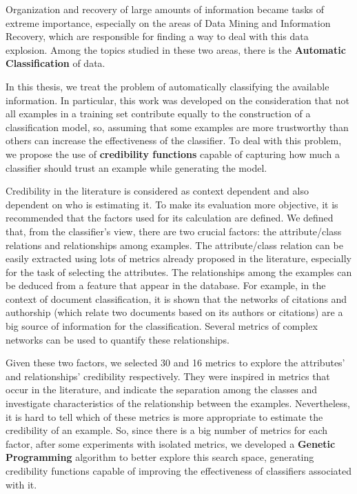 Organization and recovery of large amounts of information became tasks of
extreme importance, especially on the areas of Data Mining and Information
Recovery, which are responsible for finding a way to deal with this data
explosion. Among the topics studied in these two areas, there is the
\textbf{Automatic Classification} of data.

In this thesis, we treat the problem of automatically classifying the available
information. In particular, this work was
developed on the consideration that not all examples in a training set
contribute equally to the construction of a classification model, so, assuming
that some examples are more trustworthy than others can increase the
effectiveness of the classifier. To deal with this problem, we propose the use of
\textbf{credibility functions} capable of capturing how much a classifier should
trust an example while generating the model.

Credibility in the literature is considered as context dependent and also dependent on who is estimating it.
To make its evaluation more objective, it is recommended that the factors used
for its calculation are defined.
We defined that, from the classifier's view, there are two crucial factors: the
attribute/class relations and relationships among examples. The attribute/class
relation can be easily extracted using lots of metrics already proposed in the
literature, especially for the task of selecting the attributes. The
relationships among the examples can be deduced from a feature that appear in the database. For
example, in the context of document classification, it is shown that the
networks of citations and authorship (which relate two documents based on its
authors or citations) are a big source of information for the classification.
Several metrics of complex networks can be used to quantify these relationships.

Given these two factors, we selected 30 and 16 metrics to explore the 
attributes' and relationships' credibility respectively. They were inspired in
metrics that occur in the literature, and indicate the separation among the
classes and investigate characteristics of the relationship between the
examples. Nevertheless, it is hard to tell which of these metrics is more
appropriate to estimate the credibility of an example. So, since there is a big
number of metrics for each factor, after some experiments with isolated metrics,
we developed a \textbf{Genetic Programming} algorithm to better explore this
search space, generating credibility functions capable of improving the
effectiveness of classifiers associated with it.

